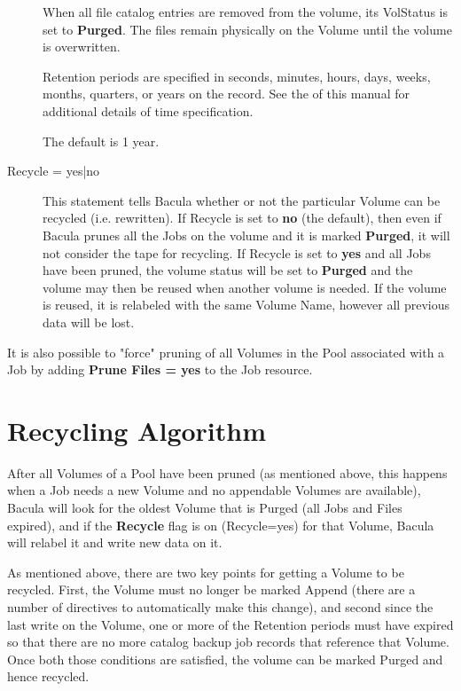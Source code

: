\begin{description}
   When all file catalog entries are removed from the volume,  its VolStatus is
   set to {\bf Purged}. The files remain physically  on the Volume until the
   volume is overwritten.  

   Retention periods are specified in seconds,  minutes, hours, days, weeks,
   months,  quarters, or years on the record. See the  
    of this  manual for
   additional details of time specification.  

The default is 1 year. 

\item [Recycle = \lt{}yes|no\gt{}]
   This statement tells Bacula whether or not the particular Volume can be
   recycled (i.e.  rewritten).  If Recycle is set to {\bf no} (the
   default), then even if Bacula prunes all the Jobs on the volume and it
   is marked {\bf Purged}, it will not consider the tape for recycling.  If
   Recycle is set to {\bf yes} and all Jobs have been pruned, the volume
   status will be set to {\bf Purged} and the volume may then be reused
   when another volume is needed.  If the volume is reused, it is relabeled
   with the same Volume Name, however all previous data will be lost.
   \end{description}

   It is also possible to "force" pruning of all Volumes in the Pool
   associated with a Job by adding {\bf Prune Files = yes} to the Job resource. 

\label{Recycling}
\label{RecyclingAlgorithm}
\section{Recycling Algorithm}

After all Volumes of a Pool have been pruned (as mentioned above, this happens
when a Job needs a new Volume and no appendable Volumes are available), Bacula
will look for the oldest Volume that is Purged (all Jobs and Files expired),
and if the {\bf Recycle} flag is on (Recycle=yes) for that Volume, Bacula will
relabel it and write new data on it. 

As mentioned above, there are two key points for getting a Volume
to be recycled. First, the Volume must no longer be marked Append (there
are a number of directives to automatically make this change), and second
since the last write on the Volume, one or more of the Retention periods
must have expired so that there are no more catalog backup job records
that reference that Volume.  Once both those conditions are satisfied,
the volume can be marked Purged and hence recycled.

